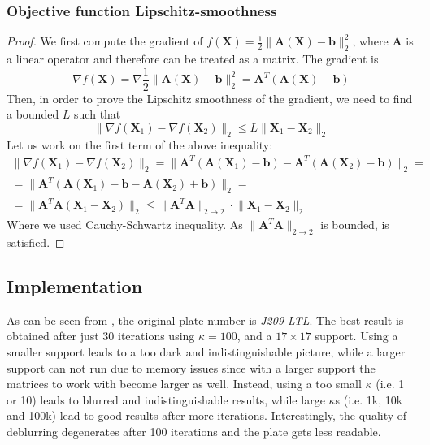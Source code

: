 \documentclass[12pt]{article}
\newcommand{\boldX}{\mathbf{X}}
\newcommand{\boldb}{\mathbf{b}}
\newcommand{\boldA}{\mathbf{A}}
\begin{document}
\subsubsection{Objective function Lipschitz-smoothness}
\begin{proof}
We first compute the gradient of $f(\boldX) = \frac{1}{2} \lVert \boldA(\boldX) - \boldb \rVert_{2}^{2}$, where $\boldA$ is a linear operator and therefore can be treated as a matrix. The gradient is
\begin{equation}
    \nabla f(\boldX) = \nabla \frac{1}{2} \lVert \boldA(\boldX) - \boldb \rVert_{2}^{2} = \boldA^T(\boldA(\boldX) - \boldb)
\end{equation}
Then, in order to prove the Lipschitz smoothness of the gradient, we need to find a bounded $L$ such that
\begin{equation} \label{eq:lipschitz}
    \lVert \nabla f(\boldX_1) - \nabla f(\boldX_2) \rVert_{2} \leq L \lVert \boldX_1 - \boldX_2 \rVert_{2}
\end{equation}
Let us work on the first term of the above inequality:
\begin{gather}
    \lVert \nabla f(\boldX_1) - \nabla f(\boldX_2) \rVert_{2} = \lVert \boldA^T(\boldA(\boldX_1) - \boldb) - \boldA^T(\boldA(\boldX_2) - \boldb) \rVert_{2} = \\
    = \lVert \boldA^T(\boldA(\boldX_1) - \boldb - \boldA(\boldX_2) + \boldb) \rVert_{2} = \\
    = \lVert \boldA^T\boldA(\boldX_1 - \boldX_2) \rVert_{2} \leq
    \lVert \boldA^T\boldA \rVert_{2 \rightarrow 2} \cdot \lVert \boldX_1 - \boldX_2 \rVert_{2}
\end{gather}
Where we used Cauchy-Schwartz inequality. As $\lVert \boldA^T\boldA \rVert_{2 \rightarrow 2}$ is bounded,  is satisfied.
\end{proof}

\subsection{Implementation}
As can be seen from , the original plate number is \textit{J209 LTL}. The best result is obtained after just 30 iterations using $\kappa = 100$, and a $17 \times 17$ support. Using a smaller support leads to a too dark and indistinguishable picture, while a larger support can not run due to memory issues since with a larger support the matrices to work with become larger as well. Instead, using a too small $\kappa$ (i.e. 1 or 10) leads to blurred and indistinguishable results, while large $\kappa$s (i.e. 1k, 10k and 100k) lead to good results after more iterations. Interestingly, the quality of deblurring degenerates after 100 iterations and the plate gets less readable.
\end{document}
